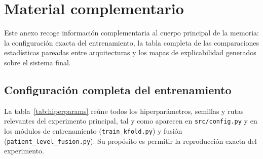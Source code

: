 \documentclass[12pt]{extarticle}
\numberwithin{equation}{section}
\begin{document}
\appendix
\section{Material complementario}\label{sec:anexo-a}

Este anexo recoge información complementaria al cuerpo principal de la memoria: la configuración exacta del entrenamiento, la tabla completa de las comparaciones estadísticas pareadas entre arquitecturas y los mapas de explicabilidad generados sobre el sistema final.

\subsection{Configuración completa del entrenamiento}\label{subsec:anexo-hiperparams}

La tabla~\ref{tab:hiperparams} reúne todos los hiperparámetros, semillas y rutas relevantes del experimento principal, tal y como aparecen en \texttt{src/config.py} y en los módulos de entrenamiento (\texttt{train\_\allowbreak kfold.py}) y fusión (\texttt{patient\_\allowbreak level\_\allowbreak fusion.py}). Su propósito es permitir la reproducción exacta del experimento.
\end{document}
